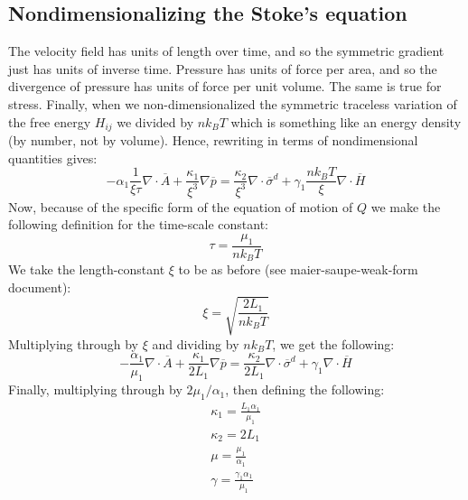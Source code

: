 \documentclass[reqno]{article}
\begin{document}
  \subsection{Nondimensionalizing the Stoke's equation}
  The velocity field has units of length over time, and so the symmetric
  gradient just has units of inverse time.
  Pressure has units of force per area, and so the divergence of pressure has
  units of force per unit volume.
  The same is true for stress.
  Finally, when we non-dimensionalized the symmetric traceless variation of the
  free energy $H_{ij}$ we divided by $n k_B T$ which is something like an energy
  density (by number, not by volume).
  Hence, rewriting in terms of nondimensional quantities gives:
  \begin{equation}
    -\alpha_1 \frac{1}{\xi \tau} \nabla \cdot \overline{A}
    + \frac{\kappa_1}{\xi^3} \nabla \overline{p}
    =
    \frac{\kappa_2}{\xi^3} \nabla \cdot \overline{\sigma}^d
    + \gamma_1 \frac{n k_B T}{\xi} \nabla \cdot \overline{H}
  \end{equation}
  Now, because of the specific form of the equation of motion of $Q$ we make the
  following definition for the time-scale constant:
  \begin{equation}
    \tau
    =
    \frac{\mu_1}{n k_B T}
  \end{equation}
  We take the length-constant $\xi$ to be as before (see maier-saupe-weak-form
  document):
  \begin{equation}
    \xi
    =
    \sqrt{\frac{2 L_1}{n k_B T}}
  \end{equation}
  Multiplying through by $\xi$ and dividing by $n k_B T$, we get the following:
  \begin{equation}
    - \frac{\alpha_1}{\mu_1} \nabla \cdot \overline{A}
    + \frac{\kappa_1}{2 L_1} \nabla \overline{p}
    =
    \frac{\kappa_2}{2 L_1} \nabla \cdot \overline{\sigma}^d
    + \gamma_1 \nabla \cdot \overline{H}
  \end{equation}
  Finally, multiplying through by $2 \mu_1 / \alpha_1$, then defining the
  following:
  \begin{equation}
    \begin{split}
      \kappa_1 = \frac{L_1 \alpha_1}{\mu_1} \\
      \kappa_2 = 2 L_1 \\
      \mu = \frac{\mu_1}{\alpha_1} \\
      \gamma = \frac{\gamma_1 \alpha_1}{\mu_1}
    \end{split}
  \end{equation}
\end{document}
